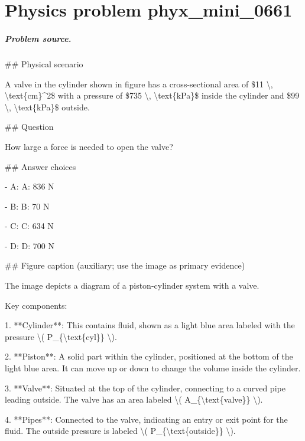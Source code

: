 
\chapter{Physics problem phyx\_mini\_0661}
\label{ch:PhyXMiniProblems_problem_phyx_mini_0661}

\paragraph{Problem source.}
\#\# Physical scenario

A valve in the cylinder shown in figure has a cross-sectional area of \$11 \textbackslash{}, \textbackslash{}text\{cm\}\textasciicircum{}2\$ with a pressure of \$735 \textbackslash{}, \textbackslash{}text\{kPa\}\$ inside the cylinder and \$99 \textbackslash{}, \textbackslash{}text\{kPa\}\$ outside.

\#\# Question

How large a force is needed to open the valve?

\#\# Answer choices

- A: A: 836 N

- B: B: 70 N

- C: C: 634 N

- D: D: 700 N

\#\# Figure caption (auxiliary; use the image as primary evidence)

The image depicts a diagram of a piston-cylinder system with a valve. 

Key components:

1. **Cylinder**: This contains fluid, shown as a light blue area labeled with the pressure \textbackslash{}( P\_\{\textbackslash{}text\{cyl\}\} \textbackslash{}).

2. **Piston**: A solid part within the cylinder, positioned at the bottom of the light blue area. It can move up or down to change the volume inside the cylinder.

3. **Valve**: Situated at the top of the cylinder, connecting to a curved pipe leading outside. The valve has an area labeled \textbackslash{}( A\_\{\textbackslash{}text\{valve\}\} \textbackslash{}).

4. **Pipes**: Connected to the valve, indicating an entry or exit point for the fluid. The outside pressure is labeled \textbackslash{}( P\_\{\textbackslash{}text\{outside\}\} \textbackslash{}).

